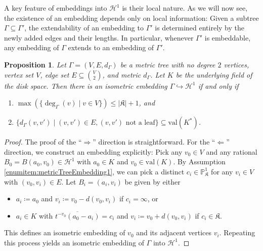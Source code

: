 \documentclass[10pt]{article}
\newtheorem{proposition}[theorem]{Proposition}
\theoremstyle{definition}
\newcommand{\PP}{\mathbb{P}}
\newcommand{\val}{{\mathrm{val}}}
\begin{document}
A key feature of embeddings into $\mathcal{H}^1$ is their local nature. As we will now see, the existence of an embedding depends only on local information: Given a subtree $\Gamma \subseteq \Gamma'$, the extendability of an embedding to $\Gamma'$ is determined entirely by the newly added edges and their lengths. In particular, whenever $\Gamma'$ is embeddable, any embedding of $\Gamma$ extends to an embedding of $\Gamma'$. 

\begin{proposition}
  \label{prop:metricTreeEmbedding}
  Let $\Gamma=(V,E,d_\Gamma)$ be a metric tree with no degree $2$ vertices, vertex set $V$, edge set $E\subseteq \binom{V}{2}$, and metric $d_\Gamma$. Let $K$ be the underlying field of the disk space.  Then there is an isometric embedding $\Gamma\hookrightarrow \mathcal H^1$ if and only if
  \begin{enumerate}
  \item \label{enumitem:metricTreeEmbedding1} $\max(\{\deg_\Gamma(v)\mid v\in V\})\leq |\mathfrak K|+1$, and
  \item \label{enumitem:metricTreeEmbedding2} $\{ d_\Gamma(v,v')\mid (v,v')\in E, (v,v') \text{ not a leaf}\} \subseteq \val(K^\ast)$.
  \end{enumerate}
\end{proposition}
\begin{proof}
  The proof of the ``$\Rightarrow$'' direction is straightforward.
  For the ``$\Leftarrow$'' direction, we construct an embedding explicitly:  Pick any $v_0\in V$ and any rational $B_0=B(a_0,v_0)\in \mathcal H^1$ with $a_0\in K$ and $v_0\in\val(K)$.  By Assumption \ref{enumitem:metricTreeEmbedding1}, we can pick a distinct $c_i\in \PP^1_{\mathfrak K}$ for any $v_i\in V$ with $(v_0,v_i)\in E$. Let $B_i=(a_i,v_i)$ be given by either
  \begin{itemize}
  \item $a_i\coloneqq a_0$ and $v_i\coloneqq v_0-d(v_0,v_i)$ if $c_i=\infty$, or
  \item $a_i\in K$ with $\overline{t^{-v_0}(a_0-a_i)}=c_i$ and $v_i\coloneqq v_0+d(v_0,v_i)$ if $c_i\in\mathfrak K$.
  \end{itemize}
  This defines an isometric embedding of $v_0$ and its adjacent vertices $v_i$.  Repeating this process yields an isometric embedding of $\Gamma$ into $\mathcal H^1$.
\end{proof}
\end{document}
